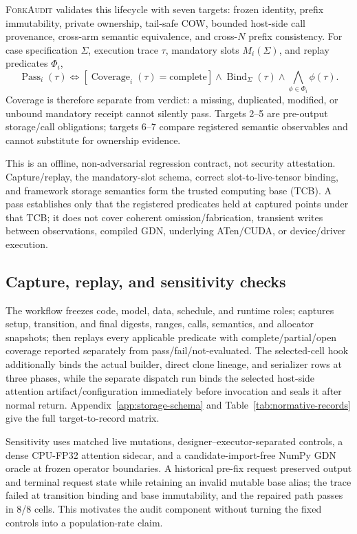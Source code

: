 \documentclass{article}
\newcommand{\method}{\textsc{ForkAudit}}
\begin{document}
\method{} validates this lifecycle with seven targets: frozen identity, prefix
immutability, private ownership, tail-safe COW, bounded host-side call
provenance, cross-arm semantic equivalence, and cross-\(N\) prefix consistency.
For case specification \(\Sigma\), execution trace \(\tau\), mandatory slots
\(M_i(\Sigma)\), and replay predicates \(\Phi_i\),
\begin{equation}
  \operatorname{Pass}_i(\tau)\Longleftrightarrow
  [\operatorname{Coverage}_i(\tau)=\mathrm{complete}]
  \wedge\operatorname{Bind}_{\Sigma}(\tau)
  \wedge\bigwedge_{\phi\in\Phi_i}\phi(\tau).
\end{equation}
Coverage is therefore separate from verdict: a missing, duplicated, modified,
or unbound mandatory receipt cannot silently pass.  Targets 2--5 are
pre-output storage/call obligations; targets 6--7 compare registered semantic
observables and cannot substitute for ownership evidence.

This is an offline, non-adversarial regression contract, not security
attestation.  Capture/replay, the mandatory-slot schema, correct
slot-to-live-tensor binding, and framework storage semantics form the trusted
computing base (TCB).  A pass establishes only that the registered predicates
held at captured points under that TCB; it does not cover coherent
omission/fabrication, transient writes between observations, compiled GDN,
underlying ATen/CUDA, or device/driver execution.

\subsection{Capture, replay, and sensitivity checks}

The workflow freezes code, model, data, schedule, and runtime roles; captures
setup, transition, and final digests, ranges, calls, semantics, and allocator
snapshots; then replays every applicable predicate with complete/partial/open
coverage reported separately from pass/fail/not-evaluated.  The selected-cell
hook additionally binds the actual builder, direct clone lineage, and serializer
rows at three phases, while the separate dispatch run binds the selected
host-side attention artifact/configuration immediately before invocation and
seals it after normal return.  Appendix~\ref{app:storage-schema} and
Table~\ref{tab:normative-records} give the full target-to-record matrix.

Sensitivity uses matched live mutations, designer--executor-separated controls,
a dense CPU-FP32 attention sidecar, and a candidate-import-free NumPy GDN oracle
at frozen operator boundaries.  A historical pre-fix request preserved output
and terminal request state while retaining an invalid mutable base alias; the
trace failed at transition binding and base immutability, and the repaired path
passes in 8/8 cells.  This motivates the audit component without turning the
fixed controls into a population-rate claim.
\end{document}
